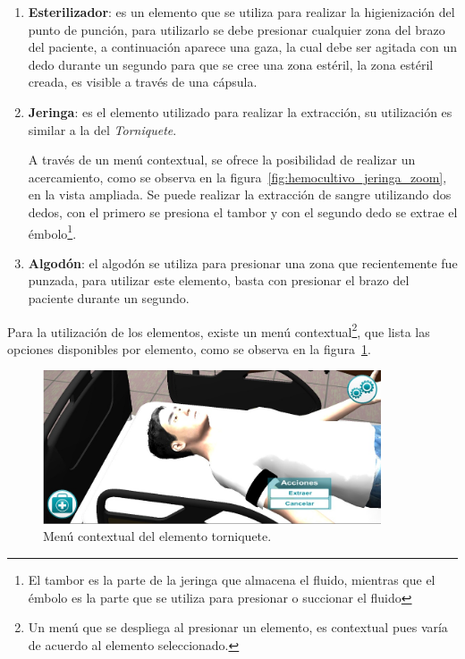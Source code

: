 \begin{itemize}
\begin{enumerate}
\item \textbf{Esterilizador}: es un elemento que se utiliza para realizar la
    higienización del punto de punción, para utilizarlo se debe presionar
    cualquier zona del brazo del paciente, a continuación aparece una gaza, la
    cual debe ser agitada con un dedo durante un segundo para que se cree una
    zona estéril, la zona estéril creada, es visible a través de una cápsula.

\item \textbf{Jeringa}: es el elemento utilizado para realizar la extracción, su
    utilización es similar a la del \emph{Torniquete}.

    A través de un menú contextual, se ofrece la posibilidad de realizar un
    acercamiento, como se observa en la figura~\ref{fig:hemocultivo_jeringa_zoom}, 
    en la vista ampliada. Se puede realizar la extracción de sangre utilizando dos dedos, 
    con el primero se presiona el tambor y con el segundo dedo se extrae el émbolo\footnote{El
    tambor es la parte de la jeringa que almacena el fluido, mientras que el
    émbolo es la parte que se utiliza para presionar o succionar el fluido}.
    
\item \textbf{Algodón}: el algodón se utiliza para presionar una zona que
    recientemente fue punzada, para utilizar este elemento, basta con presionar
    el brazo del paciente durante un segundo.
\end{enumerate}



Para la utilización de los elementos, existe un menú
contextual\footnote{Un menú que se despliega al presionar un elemento, es
    contextual pues varía de acuerdo al elemento seleccionado.}, que lista las
opciones disponibles por elemento, como se observa en la
figura~\ref{fig:hemocultivo_torniquete_cm}.

\begin{figure}[H]
\centering
\includegraphics[width=10cm]{solucion/images/hemocultivo_contextual.jpg}
\caption{Menú contextual del elemento torniquete.}
\label{fig:hemocultivo_torniquete_cm}
\end{figure}



\end{itemize}
